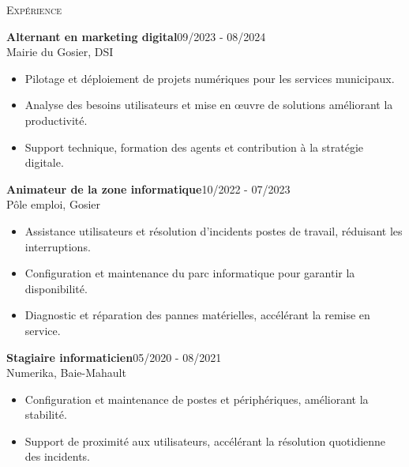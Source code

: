 \documentclass[11pt,a4paper]{article}
\newcommand{\headright}[1]{\vspace*{2.5ex}\textsc{\Large\color{cvblue}#1}\par%
  \vspace*{-2ex}{\color{cvblue}\hrulefill}\par}
\begin{document}
\begin{minipage}[t]{0.56\textwidth}
  \setlength{\parskip}{0.8ex}
  \vspace{2ex}

  \headright{Expérience}
  \colorbox{maincolor}{%
  \begin{minipage}{\linewidth}
    \noindent
    \textbf{Alternant en marketing digital}\hfill 09/2023 - 08/2024\\
    Mairie du Gosier, DSI\\[-0.3em]
    \begin{itemize}[leftmargin=*]
      \item Pilotage et déploiement de projets numériques pour les services municipaux. \item Analyse des besoins utilisateurs et mise en œuvre de solutions améliorant la productivité. \item Support technique, formation des agents et contribution à la stratégie digitale.
    \end{itemize}
  \end{minipage}}

\vspace{3mm}

\colorbox{maincolor}{%
  \begin{minipage}{\linewidth}
    \noindent
    \textbf{Animateur de la zone informatique}\hfill 10/2022 - 07/2023\\
    Pôle emploi, Gosier\\[-0.3em]
    \begin{itemize}[leftmargin=*]
      \item Assistance utilisateurs et résolution d’incidents postes de travail, réduisant les interruptions. \item Configuration et maintenance du parc informatique pour garantir la disponibilité. \item Diagnostic et réparation des pannes matérielles, accélérant la remise en service.
    \end{itemize}
  \end{minipage}}

\vspace{3mm}

\colorbox{maincolor}{%
  \begin{minipage}{\linewidth}
    \noindent
    \textbf{Stagiaire informaticien}\hfill 05/2020 - 08/2021\\
    Numerika, Baie-Mahault\\[-0.3em]
    \begin{itemize}[leftmargin=*]
      \item Configuration et maintenance de postes et périphériques, améliorant la stabilité. \item Support de proximité aux utilisateurs, accélérant la résolution quotidienne des incidents.
    \end{itemize}
  \end{minipage}}        %


\end{minipage}
\end{document}
